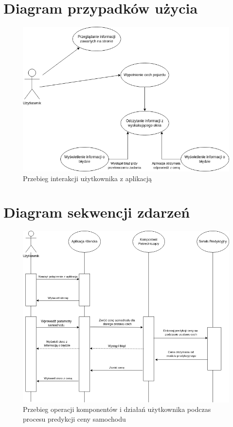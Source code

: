 \documentclass[12pt, a4paper]{report}
\begin{document}
\section{Diagram przypadków użycia}
\begin{figure}[H]
    \centering
    \includegraphics[width=1\textwidth]{diagrams/use_case_diagram.png}
    \caption{Przebieg interakcji użytkownika z aplikacją}
\end{figure}
\section{Diagram sekwencji zdarzeń}
\begin{figure}[H]
    \centering
    \includegraphics[width=1\textwidth]{diagrams/sequence_of_events_diagram.png}
    \caption{Przebieg operacji komponentów i działań użytkownika podczas procesu predykcji ceny samochodu}
\end{figure}
\end{document}
